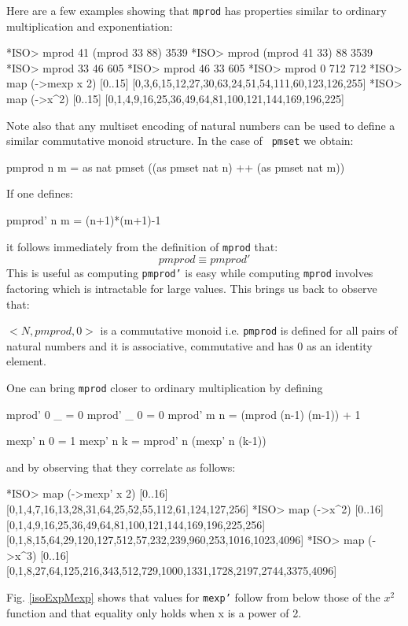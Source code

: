 \documentclass[]{INCLUDES/llncs}
\begin{document}
Here are a few examples showing that {\tt mprod} has properties similar to
ordinary multiplication and exponentiation:
\begin{codex}
*ISO> mprod 41 (mprod 33 88)
3539
*ISO> mprod (mprod 41 33)  88
3539
*ISO> mprod 33 46
605
*ISO> mprod 46 33
605
*ISO> mprod 0 712
712
*ISO> map (\x->mexp x 2) [0..15]
[0,3,6,15,12,27,30,63,24,51,54,111,60,123,126,255]
*ISO> map (\x->x^2) [0..15]
[0,1,4,9,16,25,36,49,64,81,100,121,144,169,196,225]
\end{codex}
Note also that any multiset encoding of natural numbers can be
used to define a similar commutative monoid structure. In the case of {\tt
pmset} we obtain:
\begin{code}
pmprod n m = as nat pmset ((as pmset nat n) ++ (as pmset nat m))
\end{code}
If one defines:
\begin{code}
pmprod' n m = (n+1)*(m+1)-1
\end{code}
it follows immediately from the definition of {\tt mprod} that:
\begin{equation}
pmprod \equiv pmprod'
\end{equation}
This is useful as computing {\tt pmprod'} is easy while computing {\tt mprod}
involves factoring which is intractable for large values. This brings us back to
observe that:
\begin{prop}
$<N,pmprod,0>$ is a commutative monoid i.e. {\tt pmprod} is defined for all pairs of
natural numbers and it is associative, commutative
and has 0 as an identity element.
\end{prop}
One can bring {\tt mprod} closer to ordinary multiplication by defining
\begin{code}
mprod' 0 _ = 0
mprod' _ 0 = 0
mprod' m n = (mprod (n-1) (m-1)) + 1

mexp' n 0 = 1
mexp' n k = mprod' n (mexp' n (k-1))
\end{code}
and by observing that they correlate as follows:
\begin{codex}
*ISO> map (\x->mexp' x 2) [0..16]
[0,1,4,7,16,13,28,31,64,25,52,55,112,61,124,127,256]
*ISO> map (\x->x^2) [0..16]
[0,1,4,9,16,25,36,49,64,81,100,121,144,169,196,225,256]
[0,1,8,15,64,29,120,127,512,57,232,239,960,253,1016,1023,4096]
*ISO> map (\x->x^3) [0..16]
[0,1,8,27,64,125,216,343,512,729,1000,1331,1728,2197,2744,3375,4096]
\end{codex}
Fig. \ref{isoExpMexp} shows that values for {\tt mexp'} follow from below those
of the $x^2$ function and that equality only holds when x is a power of 2.
\end{document}
